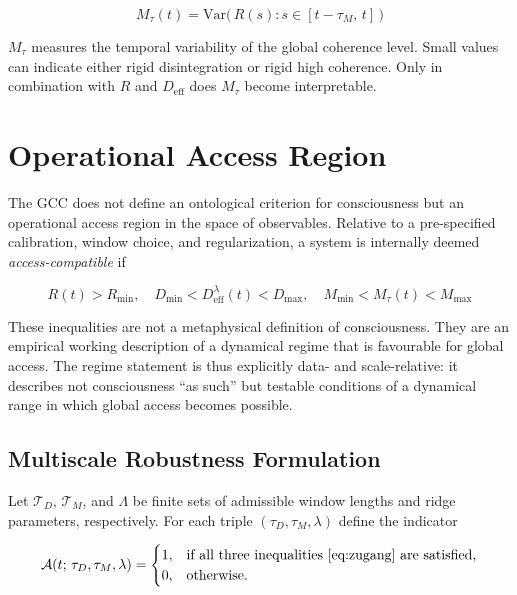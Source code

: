 \documentclass[11pt,a4paper]{article}
\theoremstyle{plain}
\theoremstyle{definition}
\theoremstyle{remark}
\newcommand{\Deff}{D_{\mathrm{eff}}}
\newcommand{\Mtau}{M_{\tau}}
\newcommand{\Rmin}{R_{\min}}
\newcommand{\Dmin}{D_{\min}}
\newcommand{\Dmax}{D_{\max}}
\newcommand{\Mmin}{M_{\min}}
\newcommand{\Mmax}{M_{\max}}
\begin{document}
\begin{equation}
\label{eq:Mtau}
\Mtau(t) = \mathrm{Var}\!\bigl(\,R(s) : s \in [t - \tau_M,\, t]\,\bigr)
\end{equation}

$\Mtau$ measures the temporal variability of the global coherence level. Small values can indicate either rigid disintegration or rigid high coherence. Only in combination with $R$ and $\Deff$ does $\Mtau$ become interpretable.


\section{Operational Access Region}
\label{sec:access-region}
\label{sec:zugang}

The GCC does not define an ontological criterion for consciousness but an operational access region in the space of observables. Relative to a pre-specified calibration, window choice, and regularization, a system is internally deemed \emph{access-compatible} if

\begin{equation}
\label{eq:zugang}
\boxed{\;
R(t) > \Rmin, \quad
\Dmin < \Deff^{\lambda}(t) < \Dmax, \quad
\Mmin < \Mtau(t) < \Mmax
\;}
\end{equation}

These inequalities are not a metaphysical definition of consciousness. They are an empirical working description of a dynamical regime that is favourable for global access. The regime statement is thus explicitly data- and scale-relative: it describes not consciousness ``as such'' but testable conditions of a dynamical range in which global access becomes possible.

\subsection{Multiscale Robustness Formulation}

Let $\mathcal{T}_D$, $\mathcal{T}_M$, and $\Lambda$ be finite sets of admissible window lengths and ridge parameters, respectively. For each triple $(\tau_D, \tau_M, \lambda)$ define the indicator

\begin{equation}
\mathcal{A}(t;\,\tau_D,\tau_M,\lambda) =
\begin{cases}
1, & \text{if all three inequalities~\eqref{eq:zugang} are satisfied,}\\
0, & \text{otherwise.}
\end{cases}
\end{equation}
\end{document}
